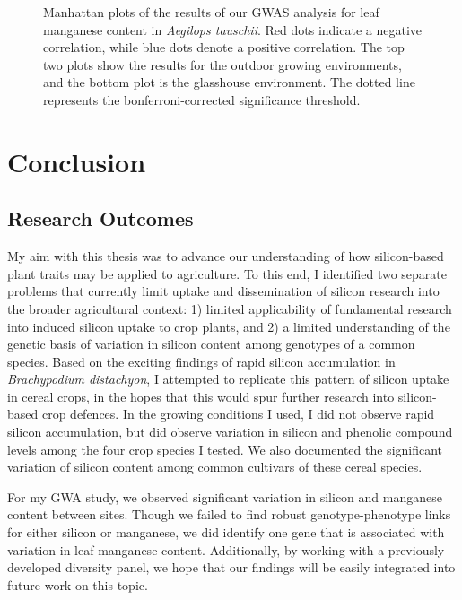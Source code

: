 \documentclass[12pt, letterpaper]{report}
\begin{document}
{\begin{figure}[h]
\begin{subfigure}[b]{\textwidth}
                \label{Fig:gh_mn_peak}
        \end{subfigure}
        \caption{Manhattan plots of the results of our GWAS analysis for leaf manganese content in \textit{Aegilops tauschii}. Red dots indicate a negative correlation, while blue dots denote a positive correlation. The top two plots show the results for the outdoor growing environments, and the bottom plot is the glasshouse environment. The dotted line represents the bonferroni-corrected significance threshold.}
        \label{Fig:mn_peak_plot_old}
\end{figure}
}

\clearpage

\chapter{Conclusion}
\section{Research Outcomes}

My aim with this thesis was to advance our understanding of how silicon-based plant traits may be applied to agriculture. To this end, I identified two separate problems that currently limit uptake and dissemination of silicon research into the broader agricultural context: 1) limited applicability of fundamental research into induced silicon uptake to crop plants, and 2) a limited understanding of the genetic basis of variation in silicon content among genotypes of a common species. Based on the exciting findings of rapid silicon accumulation in \textit{Brachypodium distachyon}, I attempted to replicate this pattern of silicon uptake in cereal crops, in the hopes that this would spur further research into silicon-based crop defences. In the growing conditions I used, I did not observe rapid silicon accumulation, but did observe variation in silicon and phenolic compound levels among the four crop species I tested. We also documented the significant variation of silicon content among common cultivars of these cereal species.

For my GWA study, we observed significant variation in silicon and manganese content between sites. Though we failed to find robust genotype-phenotype links for either silicon or manganese, we did identify one gene that is associated with variation in leaf manganese content. Additionally, by working with a previously developed diversity panel, we hope that our findings will be easily integrated into future work on this topic.
\end{document}
